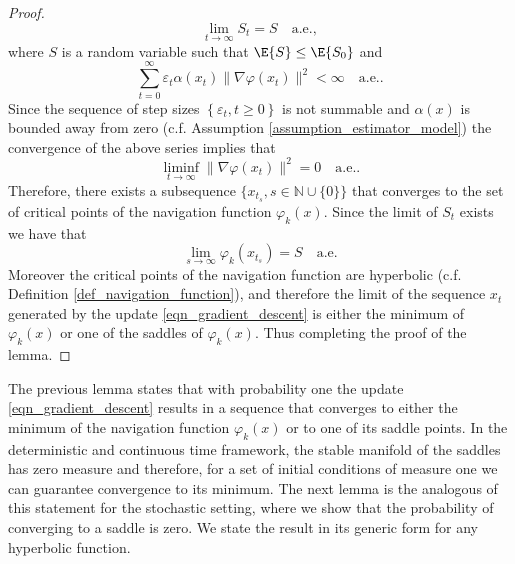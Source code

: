 \documentclass[article]{IEEEtran}
\theoremstyle{definition}
\begin{document}
\begin{proof}
\begin{equation}\label{eqn_convergence_to_random_variable}
\lim_{t\to\infty} S_t = S \quad \mbox{a.e.},
\end{equation}
%
where $S$ is a random variable such that $\E{S} \leq \E{S_0}$ and 
%
\begin{equation}
\sum_{t=0}^\infty \varepsilon_t \alpha(x_t)\|\nabla \varphi(x_t)\|^2 < \infty \quad \mbox{a.e.}.
\end{equation}
%
Since the sequence of step sizes $\left\{\varepsilon_t,t \geq 0\right\}$ is not summable and $\alpha(x)$ is bounded away from zero (c.f. Assumption \ref{assumption_estimator_model}) the convergence of the above series implies that 
%
\begin{equation}
\liminf_{t\to\infty} \|\nabla \varphi(x_t)\|^2  = 0 \quad \mbox{a.e.}.
\end{equation}
%
Therefore, there exists a subsequence $\{x_{t_s}, s\in\mathbb{N}\cup\{0\}\}$ that converges to the set of critical points of the navigation function  $\varphi_k(x)$. Since the limit of $S_t$ exists we have that
%
\begin{equation}
\lim_{s\to\infty} \varphi_k(x_{t_s}) = S \quad \mbox{a.e.}
\end{equation}
%
Moreover the critical points of the navigation function are hyperbolic (c.f. Definition \ref{def_navigation_function}), and therefore the limit of the sequence $x_t$ generated by the update \eqref{eqn_gradient_descent} is either the minimum of $\varphi_k(x)$ or one of the saddles of $\varphi_k(x)$. Thus completing the proof of the lemma.
\end{proof}
%
The previous lemma states that with probability one the update \eqref{eqn_gradient_descent} results in a sequence that converges to either the minimum of the navigation function $\varphi_k(x)$ or to one of its saddle points. In the deterministic and continuous time framework, the stable manifold of the saddles has zero measure and therefore, for a set of initial conditions of measure one we can guarantee convergence to its minimum. The next lemma is the analogous of this statement for the stochastic setting, where we show that the probability of converging to a saddle is zero. We state the result in its generic form for any hyperbolic function. 
%
\end{document}
